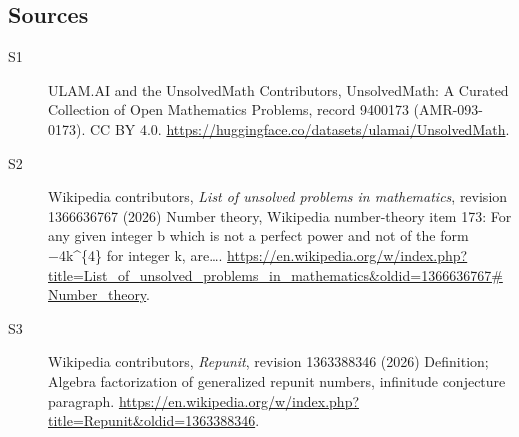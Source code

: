 \documentclass[11pt]{article}
\begin{document}
\subsection{Sources}
\begin{description}
\item[\hypertarget{source:9400173:1}{S1}] ULAM.AI and the UnsolvedMath Contributors, UnsolvedMath: A Curated Collection of Open Mathematics Problems, record 9400173 (AMR-093-0173). CC BY 4.0. \url{https://huggingface.co/datasets/ulamai/UnsolvedMath}.
\item[\hypertarget{source:9400173:2}{S2}] Wikipedia contributors, \emph{List of unsolved problems in mathematics}, revision 1366636767 (2026) Number theory, Wikipedia number-theory item 173: For any given integer b which is not a perfect power and not of the form −4k\textasciicircum{}\{4\} for integer k, are…. \url{https://en.wikipedia.org/w/index.php?title=List_of_unsolved_problems_in_mathematics&oldid=1366636767#Number_theory}.
\item[\hypertarget{source:9400173:3}{S3}] Wikipedia contributors, \emph{Repunit}, revision 1363388346 (2026) Definition; Algebra factorization of generalized repunit numbers, infinitude conjecture paragraph. \url{https://en.wikipedia.org/w/index.php?title=Repunit&oldid=1363388346}.
\end{description}
\label{end:9400173}
\end{document}
